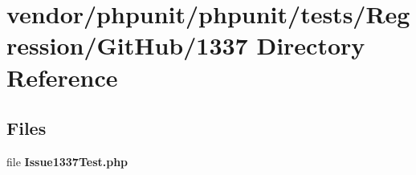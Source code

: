 \section{vendor/phpunit/phpunit/tests/\+Regression/\+Git\+Hub/1337 Directory Reference}
\label{dir_5f391dfeb4be55fd6bff30d64e80afda}
\subsection*{Files}
\begin{DoxyCompactItemize}
\item 
file {\bf Issue1337\+Test.\+php}
\end{DoxyCompactItemize}
